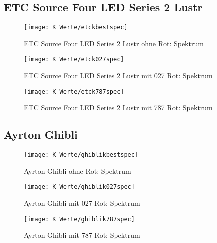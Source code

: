 \documentclass[pagesize,paper=A4,fontsize=12pt,utf8,numbers=noenddot,bibliography=totoc,listof=totoc,DIV=11,BCOR=1mm]{scrreprt}
\begin{document}
\subsection{ETC Source Four LED Series 2 Lustr}

\begin{figure}[htp]     %
\centering
\texttt{[image: K Werte/etckbestspec]} 
\caption {ETC Source Four LED Series 2 Lustr ohne Rot: Spektrum} 
\end{figure}

\begin{figure}[htp]     %
\centering
\texttt{[image: K Werte/etck027spec]} 
\caption {ETC Source Four LED Series 2 Lustr mit 027 Rot: Spektrum} 
\end{figure}

\begin{figure}[htp]     %
\centering
\texttt{[image: K Werte/etck787spec]} 
\caption {ETC Source Four LED Series 2 Lustr mit 787 Rot: Spektrum} 
\end{figure}


\subsection{Ayrton Ghibli}

\begin{figure}[htp]     %
\centering
\texttt{[image: K Werte/ghiblikbestspec]} 
\caption {Ayrton Ghibli ohne Rot: Spektrum} 
\end{figure}

\begin{figure}[htp]     %
\centering
\texttt{[image: K Werte/ghiblik027spec]} 
\caption {Ayrton Ghibli mit 027 Rot: Spektrum} 
\end{figure}

\begin{figure}[htp]     %
\centering
\texttt{[image: K Werte/ghiblik787spec]} 
\caption {Ayrton Ghibli mit 787 Rot: Spektrum} 
\end{figure}
\end{document}
